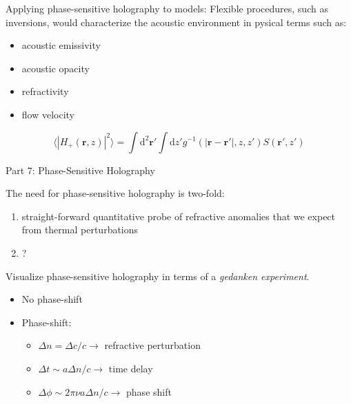 \documentclass{beamer}
\begin{document}
\begin{frame}{6.1}
    Applying phase-sensitive holography to models:
    Flexible procedures, such as inversions, would characterize the
    acoustic environment in pysical terms such as:
    \begin{itemize}
        \item acoustic emissivity
        \item acoustic opacity
        \item refractivity
        \item flow velocity
    \end{itemize}
\end{frame}

\begin{frame}{6.2}
    $$ \langle|H_{+}(\mathbf{r},z)|^{2}\rangle =
    \int\textrm{d}^{2}\mathbf{r}'\int\textrm{d}z'g^{-1}
    (|\mathbf{r}-\mathbf{r}'|,z,z')S(\mathbf{r}',z') $$
\end{frame}

\begin{frame}{Part 7: Phase-Sensitive Holography}
\end{frame}

\begin{frame}{7.1}
\end{frame}

\begin{frame}{7.2}
    The need for phase-sensitive holography is two-fold:
    \begin{enumerate}
        \item straight-forward quantitative probe of refractive anomalies
            that we expect from thermal perturbations
        \item ?
    \end{enumerate}
\end{frame}

\begin{frame}{7.3}
    Visualize phase-sensitive holography in terms of a \emph{gedanken experiment}.
    \begin{itemize}
        \item No phase-shift
        \item Phase-shift:\\
            \begin{itemize}
                \item $\Delta{n} = \Delta{c}/c \rightarrow$
                    refractive perturbation
                \item $\Delta{t} \sim a\Delta{n}/c \rightarrow$
                    time delay
                \item $\Delta{\phi} \sim 2\pi\nu a\Delta{n}/c \rightarrow$
                    phase shift
            \end{itemize}
    \end{itemize}
\end{frame}
\end{document}
